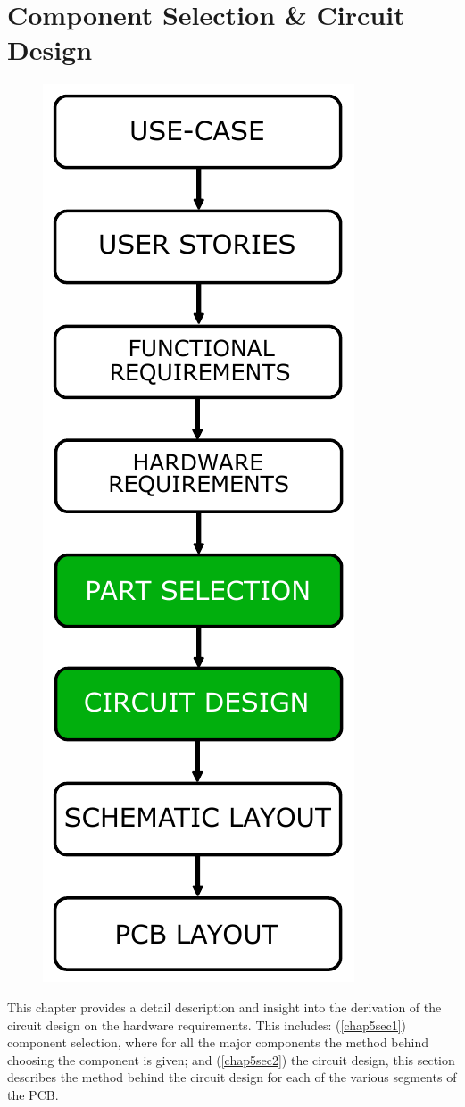 
\chapter{Component Selection \& Circuit Design} %
\label{Chapter5} %

\begin{figure}[!htb]
	\includegraphics[width=0.5\linewidth]{Figures/circuit_design_table.pdf}\centering
	\label{fig:circuit_design}
\end{figure}

This chapter provides a detail description and insight into the derivation of the circuit design on the hardware requirements. 
This includes: (\ref{chap5sec1}) component selection, where for all the major components the method behind choosing the component is given; and (\ref{chap5sec2}) the circuit design, this section describes the method behind the circuit design for each of the various segments of the PCB. 

